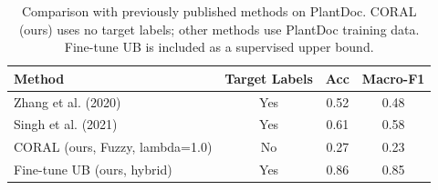 \begin{table}[htbp]
\centering
\caption{Comparison with previously published methods on PlantDoc. CORAL (ours) uses no target labels; other methods use PlantDoc training data. Fine-tune UB is included as a supervised upper bound.}
\label{tab:sota}
\begin{tabular}{lccc}
\toprule
Method & Target Labels & Acc & Macro-F1 \\
\midrule
        Zhang et al. (2020) & Yes & 0.52 & 0.48 \\
        Singh et al. (2021) & Yes & 0.61 & 0.58 \\
        CORAL (ours, Fuzzy, lambda=1.0) & No & 0.27 & 0.23 \\
        Fine-tune UB (ours, hybrid) & Yes & 0.86 & 0.85 \\
\bottomrule
\end{tabular}
\end{table}
